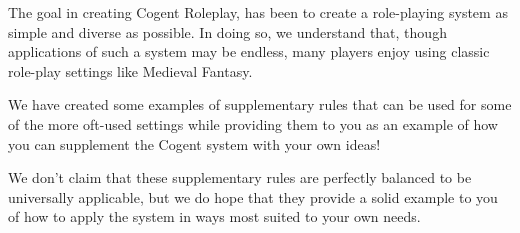The goal in creating Cogent Roleplay, has been to create a role-playing system as simple and diverse as possible. In doing so, we understand that, though applications of such a system may be endless, many players enjoy using classic role-play settings like Medieval Fantasy.

We have created some examples of supplementary rules that can be used for some of the more oft-used settings while providing them to you as an example of how you can supplement the Cogent system with your own ideas!

We don’t claim that these supplementary rules are perfectly balanced to be universally applicable, but we do hope that they provide a solid example to you of how to apply the system in ways most suited to your own needs.